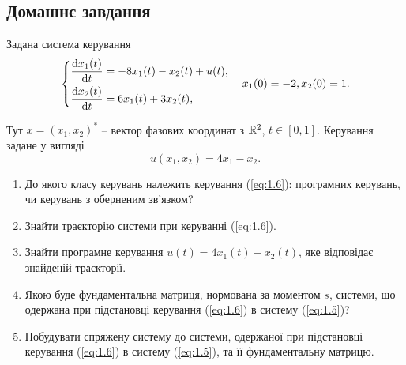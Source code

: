 \subsection{Домашнє завдання}

\begin{problem}
	Задана система керування 
	\begin{equation}
		\label{eq:1.5}
		\left\{
			\begin{aligned}
				\dfrac{\mathop{}\!\mathrm{d} x_1(t)}{\mathop{}\!\mathrm{d} t} &= -8x_1(t)  -x_2(t) + u(t),\\
				\dfrac{\mathop{}\!\mathrm{d} x_2(t)}{\mathop{}\!\mathrm{d} t} &= 6x_1(t) + 3x_2(t),
			\end{aligned}
		\right.
		\quad
		x_1(0) = -2, x_2(0) = 1.
	\end{equation}

	Тут $ x =(x_1, x_2)^*$ -- вектор фазових координат з $\mathbb{R}^2$, $t \in [0, 1]$. Керування задане у вигляді
	\begin{equation}
		\label{eq:1.6}
		u(x_1, x_2) = 4x_1 - x_2.
	\end{equation}

	\begin{enumerate}
		\item До якого класу керувань належить керування (\ref{eq:1.6}): програмних керувань, чи керувань з оберненим зв'язком?
		\item Знайти траєкторію системи при керуванні (\ref{eq:1.6}).
		\item Знайти програмне керування $u(t) = 4x_1(t) - x_2(t)$, яке відповідає знайденій траєкторії.
		\item Якою буде фундаментальна матриця, нормована за моментом $s$, системи, що одержана при підстановці керування (\ref{eq:1.6}) в систему (\ref{eq:1.5})?
		\item Побудувати спряжену систему до системи, одержаної при підстановці керування (\ref{eq:1.6}) в систему (\ref{eq:1.5}), та її фундаментальну матрицю.
	\end{enumerate}
\end{problem}

